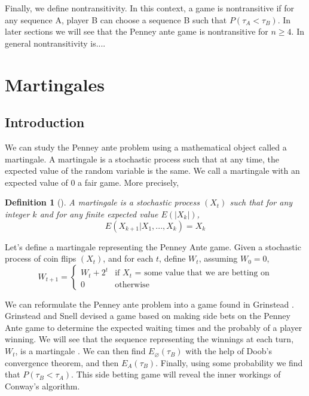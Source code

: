 \documentclass{article}
\newtheorem{definition}[theorem]{Definition}
\numberwithin{mytheorem}{subsection} %
\begin{document}

		Finally, we define nontransitivity. In this context, a game is nontransitive if for any sequence A, player B can choose a sequence B such that $P(\tau_A < \tau_B)$. In later sections we will see that the Penney ante game is nontransitive for $n \geq 4$. In general nontransitivity is....

	\section{Martingales}
		\subsection{Introduction}
			We can study the Penney ante problem using a mathematical object called a martingale. A martingale is a stochastic process such that at any time, the expected value of the random variable is the same. We call a martingale with an expected value of 0 a fair game. More precisely,

			\begin{definition}[\cite{li}]
				A {\em martingale} is a stochastic process $(X_t)$ such that for any
				integer $k$ and for any finite expected value $E(|X_k|)$, $$E(X_{k+1} | X_1, ..., X_k) = X_k$$		
			\end{definition}

		    Let's define a martingale representing the Penney Ante game. Given a stochastic process of coin flips $(X_t)$, and for each $t$, define $W_t$, assuming $W_0=0$,
		    \[ W_{t+1}=\begin{cases} 
		      W_{t} + 2^t & \text{if $X_t$ = some value that we are betting on}\\
		      0 & \text{otherwise} 
			  \end{cases} \]

		    We can reformulate the Penney ante problem into a game found in Grinstead \cite{grinstead}. Grinstead and Snell devised a game based on making side bets on the Penney Ante game to determine the expected waiting times and the probably of a player winning. We will see that the sequence representing the winnings at each turn, $W_t$, is a martingale \cite{grinstead}. We can then find $E_{\varnothing}(\tau_{B})$ with the help of Doob's convergence theorem, and then $E_A(\tau_{B})$. Finally, using some probability we find that $P(\tau_{B} < \tau_{A})$. This side betting game will reveal the inner workings of Conway's algorithm. 
\end{document}
